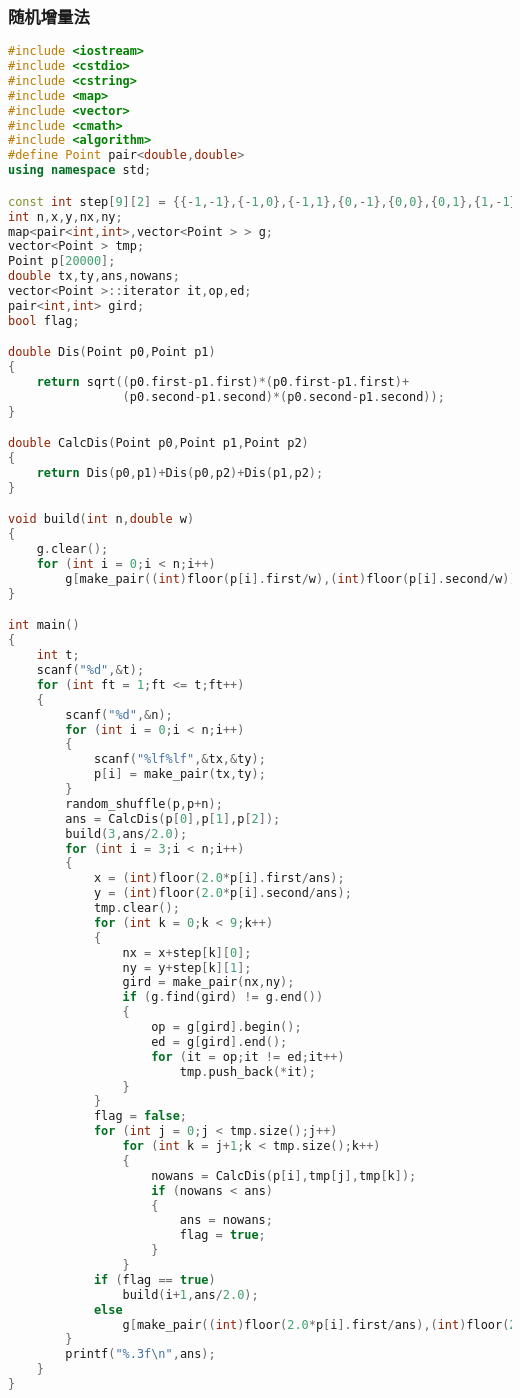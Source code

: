 	\subsubsection{随机增量法}
	\begin{lstlisting}[language=c++]
#include <iostream>
#include <cstdio>
#include <cstring>
#include <map>
#include <vector>
#include <cmath>
#include <algorithm>
#define Point pair<double,double>
using namespace std;

const int step[9][2] = {{-1,-1},{-1,0},{-1,1},{0,-1},{0,0},{0,1},{1,-1},{1,0},{1,1}};
int n,x,y,nx,ny;
map<pair<int,int>,vector<Point > > g;
vector<Point > tmp;
Point p[20000];
double tx,ty,ans,nowans;
vector<Point >::iterator it,op,ed;
pair<int,int> gird;
bool flag;

double Dis(Point p0,Point p1)
{
	return sqrt((p0.first-p1.first)*(p0.first-p1.first)+
				(p0.second-p1.second)*(p0.second-p1.second));
}

double CalcDis(Point p0,Point p1,Point p2)
{
	return Dis(p0,p1)+Dis(p0,p2)+Dis(p1,p2);
}

void build(int n,double w)
{
	g.clear();
	for (int i = 0;i < n;i++)
		g[make_pair((int)floor(p[i].first/w),(int)floor(p[i].second/w))].push_back(p[i]);
}

int main()
{
	int t;
	scanf("%d",&t);
	for (int ft = 1;ft <= t;ft++)
	{
		scanf("%d",&n);
		for (int i = 0;i < n;i++)
		{
			scanf("%lf%lf",&tx,&ty);
			p[i] = make_pair(tx,ty);
		}
		random_shuffle(p,p+n);
		ans = CalcDis(p[0],p[1],p[2]);
		build(3,ans/2.0);
		for (int i = 3;i < n;i++)
		{
			x = (int)floor(2.0*p[i].first/ans);
			y = (int)floor(2.0*p[i].second/ans);
			tmp.clear();
			for (int k = 0;k < 9;k++)
			{
				nx = x+step[k][0];
				ny = y+step[k][1];
				gird = make_pair(nx,ny);
				if (g.find(gird) != g.end())
				{
					op = g[gird].begin();
					ed = g[gird].end();
					for (it = op;it != ed;it++)
						tmp.push_back(*it);
				}
			}
			flag = false;
			for (int j = 0;j < tmp.size();j++)
				for (int k = j+1;k < tmp.size();k++)
				{
					nowans = CalcDis(p[i],tmp[j],tmp[k]);
					if (nowans < ans)
					{
						ans = nowans;
						flag = true;
					}
				}
			if (flag == true)
				build(i+1,ans/2.0);
			else
				g[make_pair((int)floor(2.0*p[i].first/ans),(int)floor(2.0*p[i].second/ans))].push_back(p[i]);
		}
		printf("%.3f\n",ans);
	}
}
	\end{lstlisting}